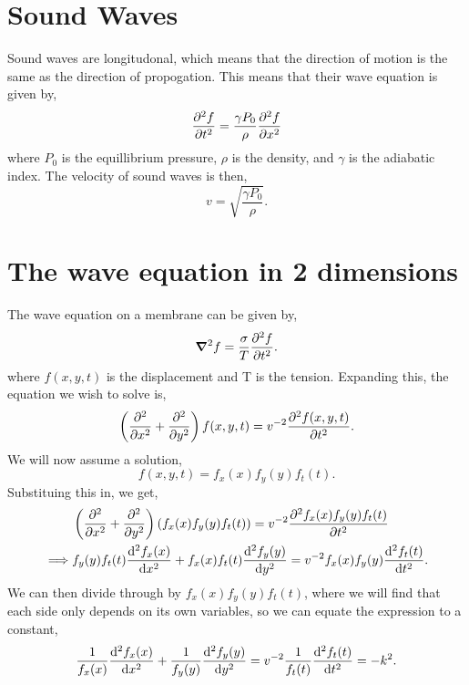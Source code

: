 \documentclass{book}
\begin{document}
\section{Sound Waves}
Sound waves are longitudonal, which means that the direction of motion is the same as the direction of propogation. This means that their wave equation is given by,
\begin{equation}
	\pdv[2]{f}{t} = \frac{\gamma P_0}{\rho}\pdv[2]{f}{x}
\end{equation}
where $P_0$ is the equillibrium pressure, $\rho$ is the density, and $\gamma$ is the adiabatic index. The velocity of sound waves is then,
\begin{equation}
	v = \sqrt{\frac{\gamma P_0}{\rho}}.
\end{equation}

\section{The wave equation in 2 dimensions}
The wave equation on a membrane can be given by,
\begin{equation}
	\grad^2 f = \frac{\sigma}{T} \pdv[2]{f}{t}.
\end{equation}
where $f(x,y,t)$ is the displacement and T is the tension. Expanding this, the equation we wish to solve is,
\begin{equation}
	\left(\pdv[2]{}{x} + \pdv[2]{}{y}\right)f(x,y,t) = v^{-2}\pdv[2]{f(x,y,t)}{t}.
\end{equation}
We will now assume a solution,
\begin{equation}
	f(x,y,t) = f_x(x)f_y(y)f_t(t).
\end{equation}
Substituing this in, we get, 
\begin{equation}
	\begin{split}
		& \left(\pdv[2]{}{x} + \pdv[2]{}{y}\right)\left(f_x(x)f_y(y)f_t(t)\right) = v^{-2}\pdv[2]{f_x(x)f_y(y)f_t(t)}{t} \\
		\implies & f_y(y)f_t(t)\dv[2]{f_x(x)}{x} + f_x(x)f_t(t)\dv[2]{f_y(y)}{y} = v^{-2}f_x(x)f_y(y)\dv[2]{f_t(t)}{t}.
	\end{split}
\end{equation}
We can then divide through by $f_x(x)f_y(y)f_t(t)$, where we will find that each side only depends on its own variables, so we can equate the expression to a constant,
\begin{equation}
	\frac{1}{f_x(x)}\dv[2]{f_x(x)}{x} + \frac{1}{f_y(y)}\dv[2]{f_y(y)}{y} = v^{-2}\frac{1}{f_t(t)}\dv[2]{f_t(t)}{t} = -k^2.
\end{equation}
\end{document}

